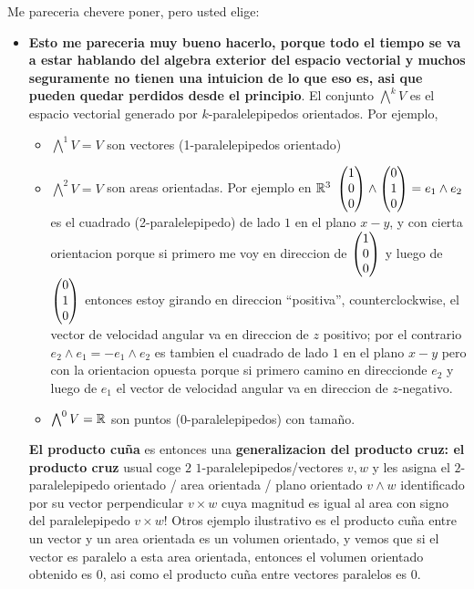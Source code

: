 \begin{frame}
    \tiny 
    Me pareceria chevere poner, pero usted elige:
    
        \begin{itemize}
        
        \item \textbf{Esto me pareceria muy bueno hacerlo, porque todo el tiempo se va a estar hablando del algebra exterior del espacio vectorial y muchos seguramente no tienen una intuicion de lo que eso es, asi que pueden quedar perdidos desde el principio}. El conjunto $\bigwedge^k V$ es el espacio vectorial generado por $k$-paralelepipedos orientados. Por ejemplo, 
        
            \begin{itemize}
                
            \item \tiny $\bigwedge^1 V = V$ son vectores (1-paralelepipedos orientado)
            
            \item $\bigwedge^2 V = V$ son areas orientadas. Por ejemplo en $\mathbb R^3$ $ \begin{pmatrix} 1 \\ 0 \\ 0 \end{pmatrix} \wedge \begin{pmatrix} 0 \\ 1 \\ 0 \end{pmatrix} = e_1 \wedge e_2$ es el cuadrado (2-paralelepipedo) de lado $1$ en el plano $x-y$, y con cierta orientacion porque si primero me voy en direccion de $\begin{pmatrix} 1 \\ 0 \\ 0 \end{pmatrix}$ y luego de $\begin{pmatrix} 0 \\ 1 \\ 0 \end{pmatrix}$ entonces estoy girando en direccion ``positiva'', counterclockwise, el vector de velocidad angular va en direccion de $z$ positivo; por el contrario $e_2 \wedge e_1 = -e_1 \wedge e_2$ es tambien el cuadrado de lado $1$ en el plano $x-y$ pero con la orientacion opuesta porque si primero camino en direccionde $e_2$ y luego de $e_1$ el vector de velocidad angular va en direccion de $z$-negativo.
            
            \item $\bigwedge^0 V = \mathbb R$ son puntos (0-paralelepipedos) con tamaño.
        
            \end{itemize}  
        
        \textbf{El producto cuña} es entonces una \textbf{generalizacion del producto cruz: el producto cruz} usual coge $2$ $1$-paralelepipedos/vectores $v, w$ y les asigna el $2$-paralelepipedo orientado / area orientada / plano orientado  $v \wedge w$ identificado por su vector perpendicular $v \times w$ cuya magnitud es igual al area con signo del paralelepipedo $v \times w$! Otros ejemplo ilustrativo es el producto cuña entre un vector y un area orientada es un volumen orientado, y vemos que si el vector es paralelo a esta area orientada, entonces el volumen orientado obtenido es $0$, asi como el producto cuña entre vectores paralelos es $0$.
        

\end{itemize}
\end{frame}
